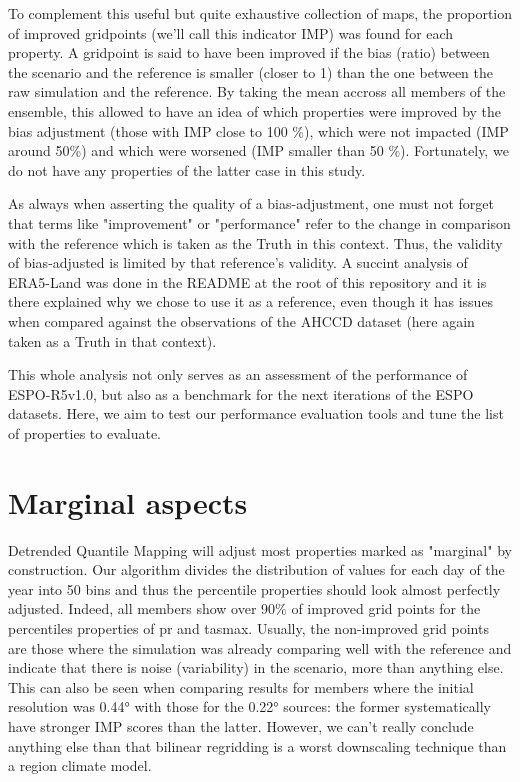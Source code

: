 \documentclass[letterpaper,10pt]{article}
\begin{document}
To complement this useful but quite exhaustive collection of maps, the proportion of improved gridpoints (we'll call this indicator IMP) was found for each property. A gridpoint is said to have been improved if the bias (ratio) between the scenario and the reference is smaller (closer to 1) than the one between the raw simulation and the reference. By taking the mean accross all members of the ensemble, this allowed to have an idea of which properties were improved by the bias adjustment (those with IMP close to 100 \%), which were not impacted (IMP around 50\%) and which were worsened (IMP smaller than 50 \%). Fortunately, we do not have any properties of the latter case in this study.

As always when asserting the quality of a bias-adjustment, one must not forget that terms like "improvement" or "performance" refer to the change in comparison with the reference which is taken as the Truth in this context. Thus, the validity of bias-adjusted is limited by that reference's validity. A succint analysis of ERA5-Land was done in the README at the root of this repository and it is there explained why we chose to use it as a reference, even though it has issues when compared against the observations of the AHCCD dataset (here again taken as a Truth in that context).

This whole analysis not only serves as an assessment of the performance of ESPO-R5v1.0, but also as a benchmark for the next iterations of the ESPO datasets. Here, we aim to test our performance evaluation tools and tune the list of properties to evaluate.

\section{Marginal aspects}\label{sec:marg}
Detrended Quantile Mapping will adjust most properties marked as "marginal" by construction. Our algorithm divides the distribution of values for each day of the year into 50 bins and thus the percentile properties should look almost perfectly adjusted. Indeed, all members show over 90\% of improved grid points for the percentiles properties of pr and tasmax. Usually, the non-improved grid points are those where the simulation was already comparing well with the reference and indicate that there is noise (variability) in the scenario, more than anything else. This can also be seen when comparing results for members where the initial resolution was 0.44° with those for the 0.22° sources: the former systematically have stronger IMP scores than the latter. However, we can't really conclude anything else than that bilinear regridding is a worst downscaling technique than a region climate model.
\end{document}
